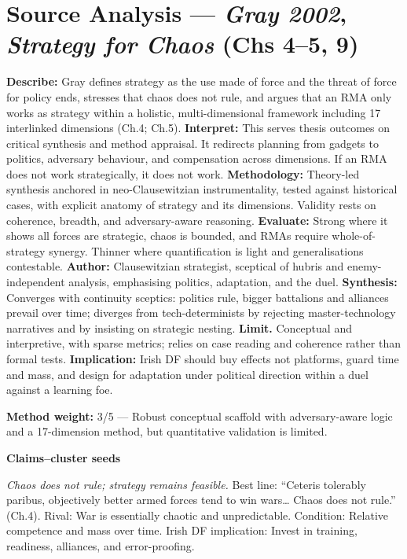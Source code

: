 \section*{Source Analysis — \textit{Gray 2002}, \textit{Strategy for Chaos} (Chs 4–5, 9)}
\textbf{Describe:} Gray defines strategy as the use made of force and the threat of force for policy ends, stresses that chaos does not rule, and argues that an RMA only works as strategy within a holistic, multi-dimensional framework including 17 interlinked dimensions (Ch.4; Ch.5).
\textbf{Interpret:} This serves thesis outcomes on critical synthesis and method appraisal. It redirects planning from gadgets to politics, adversary behaviour, and compensation across dimensions. If an RMA does not work strategically, it does not work.
\textbf{Methodology:} Theory-led synthesis anchored in neo-Clausewitzian instrumentality, tested against historical cases, with explicit anatomy of strategy and its dimensions. Validity rests on coherence, breadth, and adversary-aware reasoning.
\textbf{Evaluate:} Strong where it shows all forces are strategic, chaos is bounded, and RMAs require whole-of-strategy synergy. Thinner where quantification is light and generalisations contestable.
\textbf{Author:} Clausewitzian strategist, sceptical of hubris and enemy-independent analysis, emphasising politics, adaptation, and the duel.
\textbf{Synthesis:} Converges with continuity sceptics: politics rule, bigger battalions and alliances prevail over time; diverges from tech-determinists by rejecting master-technology narratives and by insisting on strategic nesting.
\textbf{Limit.} Conceptual and interpretive, with sparse metrics; relies on case reading and coherence rather than formal tests.
\textbf{Implication:} Irish DF should buy effects not platforms, guard time and mass, and design for adaptation under political direction within a duel against a learning foe.

\textbf{Method weight:} 3/5 — Robust conceptual scaffold with adversary-aware logic and a 17-dimension method, but quantitative validation is limited.

\textbf{Claims–cluster seeds}

\textit{Chaos does not rule; strategy remains feasible.} Best line: “Ceteris tolerably paribus, objectively better armed forces tend to win wars… Chaos does not rule.” (Ch.4). Rival: War is essentially chaotic and unpredictable. Condition: Relative competence and mass over time. Irish DF implication: Invest in training, readiness, alliances, and error-proofing.

